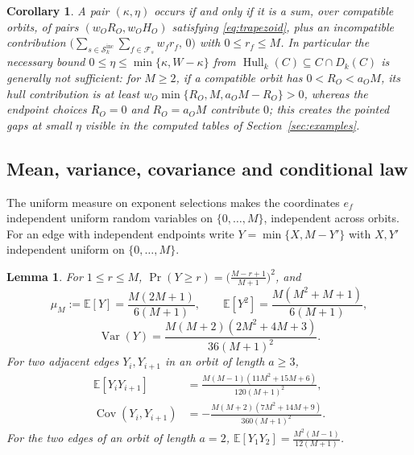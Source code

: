 \documentclass[11pt,a4paper]{article}
\newcommand{\Fs}{\mathcal F_s}
\newcommand{\Hull}{\operatorname{Hull}}
\newcommand{\Dk}{D_k}
\numberwithin{equation}{section}
\theoremstyle{plain}
\newtheorem{lemma}[theorem]{Lemma}
\newtheorem{corollary}[theorem]{Corollary}
\theoremstyle{definition}
\theoremstyle{remark}
\begin{document}
\begin{corollary}\label{cor:global-support}
A pair $(\kappa,\eta)$ occurs if and only if it is a sum, over compatible
orbits, of pairs $(w_OR_O,w_OH_O)$ satisfying \eqref{eq:trapezoid}, plus an
incompatible contribution $\bigl(\sum_{s\in\mathcal{S}_k^{\mathrm{inc}}}
\sum_{f\in\Fs}w_fr_f,\,0\bigr)$ with $0\leq r_f\leq M$.  In particular the
necessary bound $0\leq\eta\leq\min\{\kappa,W-\kappa\}$ from
$\Hull_k(C)\subseteq C\cap\Dk(C)$ is generally not sufficient: for $M\geq2$,
if a compatible orbit has $0<R_O<a_OM$, its hull contribution is at least
$w_O\min\{R_O,M,a_OM-R_O\}>0$, whereas the endpoint choices $R_O=0$ and
$R_O=a_OM$ contribute $0$; this creates the
pointed gaps at small $\eta$ visible in the computed tables of
Section~\ref{sec:examples}.
\end{corollary}

\subsection{Mean, variance, covariance and conditional law}
\label{sec:moments}

The uniform measure on exponent selections makes the coordinates $e_f$
independent uniform random variables on $\{0,\ldots,M\}$, independent across
orbits.  For an edge with independent endpoints write
$Y=\min\{X,M-Y'\}$ with $X,Y'$ independent uniform on $\{0,\ldots,M\}$.

\begin{lemma}\label{lem:edge-moments}
For $1\leq r\leq M$,
$\Pr(Y\geq r)=\bigl(\frac{M-r+1}{M+1}\bigr)^2$, and
\[
\mu_M:=\mathbb{E}[Y]=\frac{M(2M+1)}{6(M+1)},\qquad
\mathbb{E}[Y^2]=\frac{M(M^2+M+1)}{6(M+1)},
\]
\[
\operatorname{Var}(Y)
 =\frac{M(M+2)(2M^2+4M+3)}{36(M+1)^2}.
\]
For two adjacent edges $Y_i,Y_{i+1}$ in an orbit of length $a\geq3$,
\begin{align*}
\mathbb{E}[Y_iY_{i+1}]
 &=\frac{M(M-1)(11M^2+15M+6)}{120(M+1)^2},\\
\operatorname{Cov}(Y_i,Y_{i+1})
 &=-\frac{M(M+2)(7M^2+14M+9)}{360(M+1)^2}.
\end{align*}
For the two edges of an orbit of length $a=2$,
$\mathbb{E}[Y_1Y_2]=\frac{M^2(M-1)}{12(M+1)}$.
\end{lemma}
\end{document}
